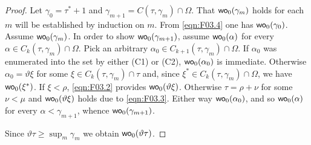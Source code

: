\documentclass[UKenglish,cleveref,DIV=12]{scrartcl}
\theoremstyle{definition}
\theoremstyle{definition}
\begin{document}
\begin{proof}
{Let $\gamma_0=\tau^*+1$ and $\gamma_{m+1} = C(\tau,\gamma_m)\cap \Omega$. That $\mathsf{wo}_0(\gamma_m)$ holds for each $m$ will be established by induction on $m$. From
\eqref{eqn:F03.4} one has $\mathsf{wo}_0(\gamma_0)$. Assume $\mathsf{wo}_0(\gamma_m)$. In
order to show $\mathsf{wo}_0(\gamma_{m+1})$, assume $\mathsf{wo}_0(\alpha)$ for every
$\alpha\in C_k(\tau,\gamma_m)\cap\Omega$. Pick an arbitrary $\alpha_0\in
C_{k+1}(\tau,\gamma_m)\cap\Omega$. If $\alpha_0$ was enumerated into the set by
either (C1) or (C2), $\mathsf{wo}_0(\alpha_0)$ is immediate. Otherwise
$\alpha_0=\vartheta\xi$ for some $\xi\in C_k(\tau,\gamma_m)\cap\tau$ and, since
$\xi^*\in C_k(\tau,\gamma_m)\cap\Omega$, we have $\mathsf{wo}_0(\xi^*)$. If $\xi<\rho$,
\eqref{eqn:F03.2} provides $\mathsf{wo}_0(\vartheta\xi)$. Otherwise $\tau=\rho+\nu$
for some $\nu<\mu$ and $\mathsf{wo}_0(\vartheta\xi)$ holds due to \eqref{eqn:F03.3}.
Either way $\mathsf{wo}_0(\alpha_0)$, and so $\mathsf{wo}_0(\alpha)$ for every
$\alpha<\gamma_{m+1}$, whence $\mathsf{wo}_0(\gamma_{m+1})$.

Since $\vartheta\tau\ge\sup_m\gamma_m$ we obtain $\mathsf{wo}_0(\vartheta\tau)$.
}
\end{proof}
\end{document}
